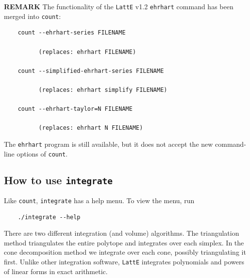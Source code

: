 \documentclass{article}
\newcommand{\latte}{{\tt LattE}\xspace}
\begin{document}
\textbf{REMARK}  The functionality of the \latte v1.2 {\tt ehrhart} command has been merged into {\tt count}:

\begin{verbatim} 
	count --ehrhart-series FILENAME
	
	      (replaces: ehrhart FILENAME)

	count --simplified-ehrhart-series FILENAME

	      (replaces: ehrhart simplify FILENAME)

	count --ehrhart-taylor=N FILENAME

	      (replaces: ehrhart N FILENAME)
\end{verbatim}

The {\tt ehrhart} program is still available, but it does not accept
   the new command-line options of {\tt count}.

\subsection{How to use {\tt integrate}}

Like {\tt count}, {\tt integrate} has a help menu. To view the menu, run

\begin{verbatim}
	./integrate --help
\end{verbatim}	

There are two different integration (and volume) algorithms. The triangulation method triangulates the entire polytope and integrates over each simplex. In the cone decomposition method we integrate over each cone, possibly triangulating it first. Unlike other integration software, \latte integrates polynomials and powers of linear forms in exact arithmetic.
\end{document}
